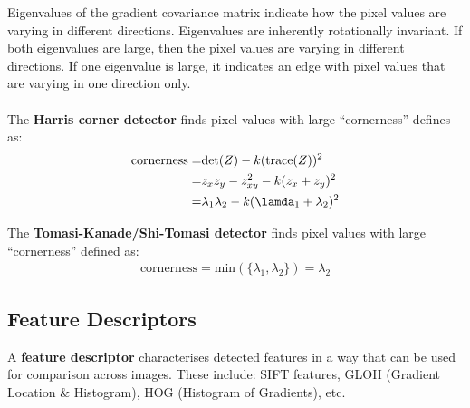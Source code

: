 \documentclass[a4paper,11pt]{article}
\begin{document}
Eigenvalues of the gradient covariance matrix indicate how the pixel values are varying in different directions.
Eigenvalues are inherently rotationally invariant.
If both eigenvalues are large, then the pixel values are varying in different directions.
If one eigenvalue is large, it indicates an edge with pixel values that are varying in one direction only.
\\\\
The \textbf{Harris corner detector} finds pixel values with large ``cornerness'' defines as:
\begin{align*}
    \text{cornerness} =& \text{det}(Z) - k (\text{trace}(Z))^2 \\
    =& z_x z_y - z_{xy}^2 - k (z_x + z_y)^2 \\
    =& \lambda_1 \lambda_2 - k(\lamda_1 + \lambda_2)^2
\end{align*}

The \textbf{Tomasi-Kanade/Shi-Tomasi detector} finds pixel values with large ``cornerness'' defined as:
\begin{align*}
    \text{cornerness} = \text{min}( \{ \lambda_1, \lambda_2 \}) = \lambda_2
\end{align*}

\subsection{Feature Descriptors}
A \textbf{feature descriptor} characterises detected features in a way that can be used for comparison across images.
These include: SIFT features, GLOH (Gradient Location \& Histogram), HOG (Histogram of Gradients), etc.
\end{document}
